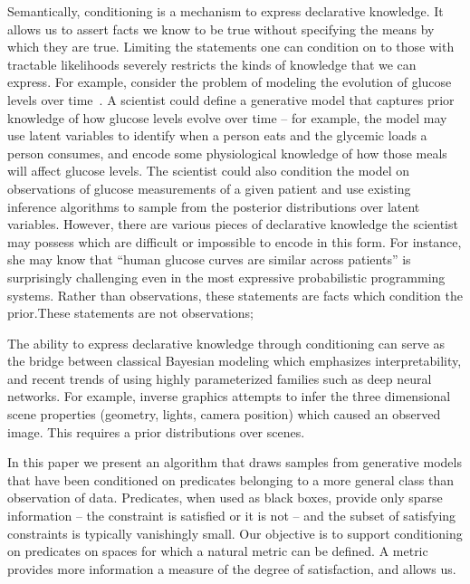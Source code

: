 Semantically, conditioning is a mechanism to express declarative knowledge.
It allows us to assert facts we know to be true without specifying the means by which they are true.
Limiting the statements one can condition on to those with tractable likelihoods severely restricts the kinds of knowledge that we can express.
For example, consider the problem of modeling the evolution of glucose levels over time~\citep{levine2017offline}.
A scientist could define a generative model that captures prior knowledge of how glucose levels evolve over time -- for example, the model may use latent variables to identify when a person eats and the glycemic loads a person consumes, and encode some physiological knowledge of how those meals will affect glucose levels.
The scientist could also condition the model on observations of glucose measurements of a given patient and use existing inference algorithms to sample from the posterior distributions over latent variables.
However, there are various pieces of declarative knowledge the scientist may possess which are difficult or impossible to encode in this form.
For instance, she may know that ``human glucose curves are similar across patients'' is surprisingly challenging even in the most expressive probabilistic programming systems. 
Rather than observations, these statements are facts which condition the prior.These statements are not observations; 

The ability to express declarative knowledge through conditioning can serve as the bridge between classical Bayesian modeling which emphasizes interpretability, and recent trends of using highly parameterized families such as deep neural networks.
For example, inverse graphics attempts to infer the three dimensional scene properties (geometry, lights, camera position) which caused an observed image.
This requires a prior distributions over scenes.



In this paper we present an algorithm that draws samples from generative models that have been conditioned on predicates belonging to a more general class than observation of data.
Predicates, when used as black boxes, provide only sparse information -- the constraint is satisfied or it is not -- and the subset of satisfying constraints is typically vanishingly small.
Our objective is to support conditioning on predicates on spaces for which a natural metric can be defined.
A metric provides more information a measure of the degree of satisfaction, and allows us.

